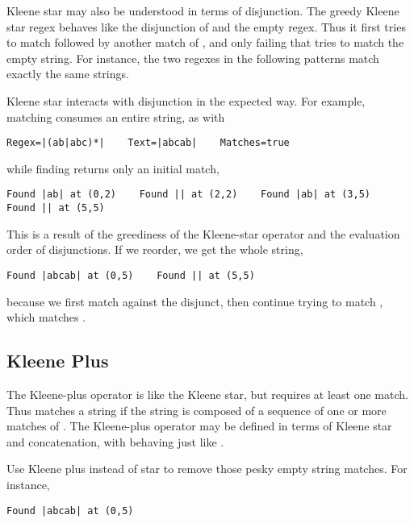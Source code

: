 Kleene star may also be understood in terms of disjunction.  The
greedy Kleene star regex  behaves like the
disjunction of  and the empty regex.
Thus it first tries to match  followed by another match of
, and only failing that tries to match the empty
string.  For instance, the two regexes in the following patterns match
exactly the same strings.
%

Kleene star interacts with disjunction in the expected way.  For
example, matching consumes an entire string, as with
%
\begin{verbatim}
Regex=|(ab|abc)*|    Text=|abcab|    Matches=true
\end{verbatim}
%
while finding returns only an initial match, 
%
\begin{verbatim}
Found |ab| at (0,2)    Found || at (2,2)    Found |ab| at (3,5)
Found || at (5,5)
\end{verbatim}
%
This is a result of the greediness of the Kleene-star operator
and the evaluation order of disjunctions.  If we reorder, we 
get the whole string,
%
\begin{verbatim}
Found |abcab| at (0,5)    Found || at (5,5)
\end{verbatim}
%
because we first match  against the disjunct, then continue
trying to match , which matches .

\subsection{Kleene Plus}

The Kleene-plus operator is like the Kleene star, but requires at
least one match.  Thus \code{+} matches a string if the
string is composed of a sequence of one or more matches of
.  The Kleene-plus operator may be defined in terms
of Kleene star and concatenation, with  behaving
just like .  

Use Kleene plus instead
of star to remove those pesky empty string matches.  For instance, 
%
\begin{verbatim}
Found |abcab| at (0,5)
\end{verbatim}

